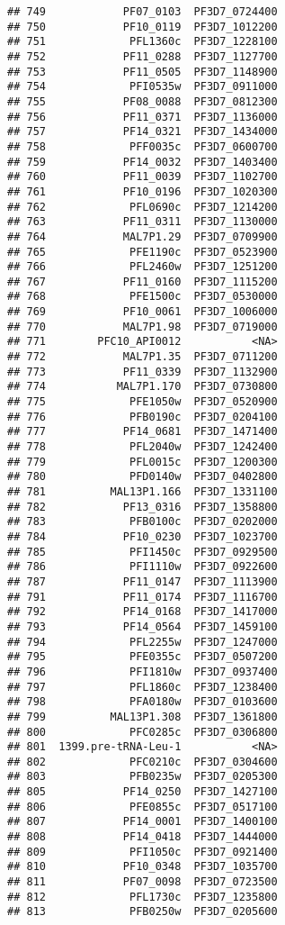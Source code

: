\documentclass{article}\usepackage[]{graphicx}\usepackage[]{color}
\makeatletter
\newenvironment{kframe}{%
 \def\at@end@of@kframe{}%
 \ifinner\ifhmode%
  \def\at@end@of@kframe{\end{minipage}}%
  \begin{minipage}{\columnwidth}%
 \fi\fi%
 \def\FrameCommand##1{\hskip\@totalleftmargin \hskip-\fboxsep
 \colorbox{shadecolor}{##1}\hskip-\fboxsep
     \hskip-\linewidth \hskip-\@totalleftmargin \hskip\columnwidth}%
 \MakeFramed {\advance\hsize-\width
   \@totalleftmargin\z@ \linewidth\hsize
   \@setminipage}}%
 {\par\unskip\endMakeFramed%
 \at@end@of@kframe}
\newenvironment{knitrout}{}{} %
\makeatother
\begin{document}
\begin{knitrout}
\begin{kframe}
\begin{verbatim}
## 749            PF07_0103  PF3D7_0724400
## 750            PF10_0119  PF3D7_1012200
## 751             PFL1360c  PF3D7_1228100
## 752            PF11_0288  PF3D7_1127700
## 753            PF11_0505  PF3D7_1148900
## 754             PFI0535w  PF3D7_0911000
## 755            PF08_0088  PF3D7_0812300
## 756            PF11_0371  PF3D7_1136000
## 757            PF14_0321  PF3D7_1434000
## 758             PFF0035c  PF3D7_0600700
## 759            PF14_0032  PF3D7_1403400
## 760            PF11_0039  PF3D7_1102700
## 761            PF10_0196  PF3D7_1020300
## 762             PFL0690c  PF3D7_1214200
## 763            PF11_0311  PF3D7_1130000
## 764            MAL7P1.29  PF3D7_0709900
## 765             PFE1190c  PF3D7_0523900
## 766             PFL2460w  PF3D7_1251200
## 767            PF11_0160  PF3D7_1115200
## 768             PFE1500c  PF3D7_0530000
## 769            PF10_0061  PF3D7_1006000
## 770            MAL7P1.98  PF3D7_0719000
## 771        PFC10_API0012           <NA>
## 772            MAL7P1.35  PF3D7_0711200
## 773            PF11_0339  PF3D7_1132900
## 774           MAL7P1.170  PF3D7_0730800
## 775             PFE1050w  PF3D7_0520900
## 776             PFB0190c  PF3D7_0204100
## 777            PF14_0681  PF3D7_1471400
## 778             PFL2040w  PF3D7_1242400
## 779             PFL0015c  PF3D7_1200300
## 780             PFD0140w  PF3D7_0402800
## 781          MAL13P1.166  PF3D7_1331100
## 782            PF13_0316  PF3D7_1358800
## 783             PFB0100c  PF3D7_0202000
## 784            PF10_0230  PF3D7_1023700
## 785             PFI1450c  PF3D7_0929500
## 786             PFI1110w  PF3D7_0922600
## 787            PF11_0147  PF3D7_1113900
## 791            PF11_0174  PF3D7_1116700
## 792            PF14_0168  PF3D7_1417000
## 793            PF14_0564  PF3D7_1459100
## 794             PFL2255w  PF3D7_1247000
## 795             PFE0355c  PF3D7_0507200
## 796             PFI1810w  PF3D7_0937400
## 797             PFL1860c  PF3D7_1238400
## 798             PFA0180w  PF3D7_0103600
## 799          MAL13P1.308  PF3D7_1361800
## 800             PFC0285c  PF3D7_0306800
## 801  1399.pre-tRNA-Leu-1           <NA>
## 802             PFC0210c  PF3D7_0304600
## 803             PFB0235w  PF3D7_0205300
## 805            PF14_0250  PF3D7_1427100
## 806             PFE0855c  PF3D7_0517100
## 807            PF14_0001  PF3D7_1400100
## 808            PF14_0418  PF3D7_1444000
## 809             PFI1050c  PF3D7_0921400
## 810            PF10_0348  PF3D7_1035700
## 811            PF07_0098  PF3D7_0723500
## 812             PFL1730c  PF3D7_1235800
## 813             PFB0250w  PF3D7_0205600

\end{verbatim}
\end{kframe}
\end{knitrout}
\end{document}
